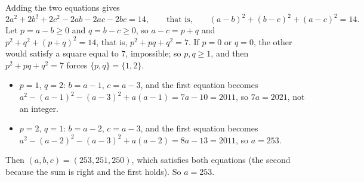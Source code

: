 Adding the two equations gives
\[2a^2+2b^2+2c^2-2ab-2ac-2bc=14,\qquad\text{that is,}\qquad (a-b)^2+(b-c)^2+(a-c)^2=14 .\]
Let $p=a-b\ge0$ and $q=b-c\ge0$, so $a-c=p+q$ and $p^2+q^2+(p+q)^2=14$, that is, $p^2+pq+q^2=7$. If $p=0$ or $q=0$, the other would satisfy a square equal to $7$, impossible; so $p,q\ge1$, and then $p^2+pq+q^2=7$ forces $\{p,q\}=\{1,2\}$.
\begin{itemize}
\item $p=1$, $q=2$: $b=a-1$, $c=a-3$, and the first equation becomes $a^2-(a-1)^2-(a-3)^2+a(a-1)=7a-10=2011$, so $7a=2021$, not an integer.
\item $p=2$, $q=1$: $b=a-2$, $c=a-3$, and the first equation becomes $a^2-(a-2)^2-(a-3)^2+a(a-2)=8a-13=2011$, so $a=253$.
\end{itemize}
Then $(a,b,c)=(253,251,250)$, which satisfies both equations (the second because the sum is right and the first holds). So $a=\boxed{253}$.
